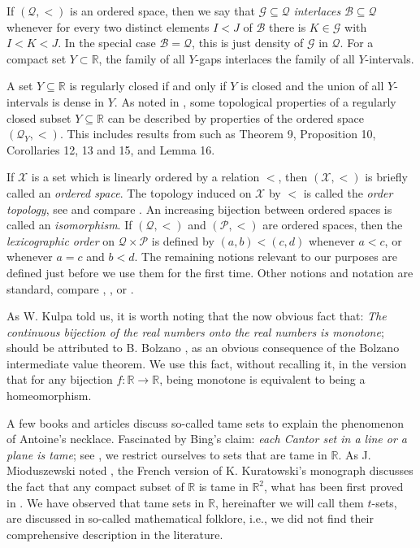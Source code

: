 \documentclass[12pt,a4paper,leqno]{amsart}
\theoremstyle{definition}
\begin{document}
If $(\mathcal Q,<)$ is an ordered space, then we say that $\mathcal G \subseteq \mathcal Q$ \textit{interlaces} $\mathcal B\subseteq \mathcal Q$ whenever for every two distinct elements $I<J$ of $\mathcal B$ there is $K\in\mathcal G$ with $I<K<J$.  In the special case $\mathcal B=\mathcal Q$, this is just density of $\mathcal G$ in  $\mathcal Q$.
For a compact set $Y\subset \mathbb R$, the family of all $Y$-gaps interlaces the family of all $Y$-intervals. 


 
A set $Y\subseteq \mathbb R$ is regularly closed if and only if  $Y$ is closed and the union of all $Y$-intervals is dense in $Y.$ 
As noted in \cite{bkp}, some  topological properties of a regularly closed subset $Y\subseteq \mathbb R$ can be described by  properties of the ordered space $(\mathcal Q_Y, <)$. This includes results from \cite{bkp} such as Theorem 9, Proposition 10, Corollaries 12, 13 and 15,  and Lemma  16. 

 If $\mathcal X$ is a set which is  linearly ordered by a  relation $<$, then $(\mathcal X,<)$ is briefly called an \textit{ordered space}.  The topology induced on $\mathcal X$ by $<$  is called the \textit{order topology}, see \cite[pp. 56-57]{enge}  and compare \cite[p. 66]{ss}.  An increasing bijection between ordered spaces is called an \textit{isomorphism}. If  $(\mathcal Q, <)$ and $(\mathcal P, <)$ are ordered spaces, then the \textit{lexicographic order} on  $\mathcal Q \times \mathcal P$  is defined by $(a,b) < (c,d)$ whenever $a<c$, or  whenever $a=c$ and $b<d$.  The remaining notions relevant to our purposes are defined just before we use them for the first time. Other  notions and notation are standard, compare \cite{bkp}, \cite{enge}, \cite{si} or \cite{ss}. 
  
	As W. Kulpa told us, it is worth noting that the now obvious fact that: \textit{The continuous bijection of the real numbers onto the real numbers is
	monotone}; should be attributed to B. Bolzano \cite{bo}, as an obvious consequence of the Bolzano intermediate value theorem. We use this fact, without recalling it, in the version that for any bijection $f\colon \mathbb R \to \mathbb R$, being  monotone  is equivalent to being a homeomorphism. 

A few  books and articles  discuss so-called tame sets to explain the phenomenon  of Antoine's necklace.   Fascinated  by Bing's claim: \textit{each
Cantor set in a line or a plane is tame}; see \cite[p. 435]{bi}, we restrict ourselves to sets that are tame in $\mathbb R$. As J. Mioduszewski noted 
\cite[p. 161]{mi},  the French version of K. Kuratowski's monograph \cite[pp. 341--385]{kur} discusses the fact that any compact subset of $\mathbb R$ is tame in $\mathbb R^2$, what has been first proved in  \cite{mk}. We have observed that   tame sets in $\mathbb R$, hereinafter we will call them $t$-sets, are discussed  in  so-called mathematical folklore, i.e., we did not find their comprehensive description in the literature.
\end{document}
